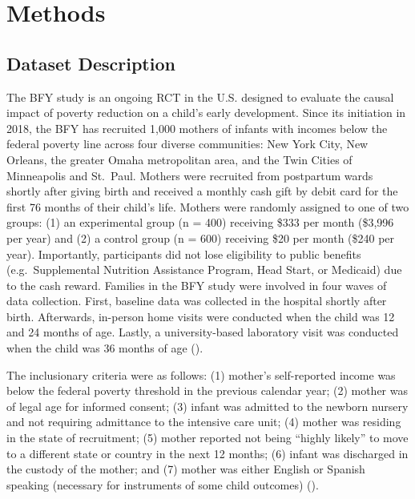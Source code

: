 \documentclass[sn-basic,pdflatex]{sn-jnl}
\begin{document}
\section{Methods}\label{methods}

\subsection{Dataset Description}\label{dataset-description}

The BFY study is an ongoing RCT in the U.S. designed to evaluate the
causal impact of poverty reduction on a child's early development. Since
its initiation in 2018, the BFY has recruited 1,000 mothers of infants
with incomes below the federal poverty line across four diverse
communities: New York City, New Orleans, the greater Omaha metropolitan
area, and the Twin Cities of Minneapolis and St.~Paul. Mothers were
recruited from postpartum wards shortly after giving birth and received
a monthly cash gift by debit card for the first 76 months of their
child's life. Mothers were randomly assigned to one of two groups: (1)
an experimental group (n = 400) receiving \$333 per month (\$3,996 per
year) and (2) a control group (n = 600) receiving \$20 per month (\$240
per year). Importantly, participants did not lose eligibility to public
benefits (e.g.~Supplemental Nutrition Assistance Program, Head Start, or
Medicaid) due to the cash reward. Families in the BFY study were
involved in four waves of data collection. First, baseline data was
collected in the hospital shortly after birth. Afterwards, in-person
home visits were conducted when the child was 12 and 24 months of age.
Lastly, a university-based laboratory visit was conducted when the child
was 36 months of age (\citet{noble_babys_2021}).

The inclusionary criteria were as follows: (1) mother's self-reported
income was below the federal poverty threshold in the previous calendar
year; (2) mother was of legal age for informed consent; (3) infant was
admitted to the newborn nursery and not requiring admittance to the
intensive care unit; (4) mother was residing in the state of
recruitment; (5) mother reported not being ``highly likely'' to move to
a different state or country in the next 12 months; (6) infant was
discharged in the custody of the mother; and (7) mother was either
English or Spanish speaking (necessary for instruments of some child
outcomes) (\citet{noble_babys_2021}).
\end{document}
